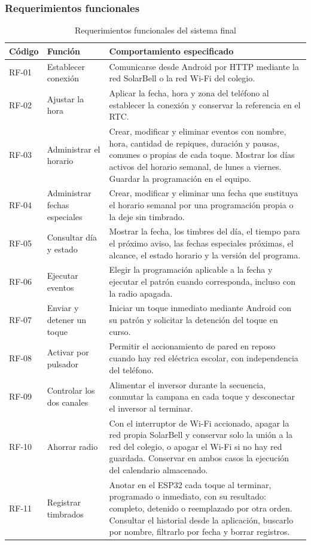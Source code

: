 \documentclass[a4paper,11pt]{article}
\begin{document}
\subsubsection{Requerimientos funcionales}
\begin{table}[H]
\centering\small
\caption{Requerimientos funcionales del sistema final}
\label{tab:rf}
\begin{tabularx}{\linewidth}{@{}P{1.33cm}P{3.02cm}Y@{}}
\toprule
\textbf{Código} & \textbf{Función} & \textbf{Comportamiento especificado} \\
\midrule
RF-01 & Establecer conexión & Comunicarse desde Android por HTTP mediante la red SolarBell o la red Wi-Fi del colegio. \\
RF-02 & Ajustar la hora & Aplicar la fecha, hora y zona del teléfono al establecer la conexión y conservar la referencia en el RTC. \\
RF-03 & Administrar el horario & Crear, modificar y eliminar eventos con nombre, hora, cantidad de repiques, duración y pausas, comunes o propias de cada toque. Mostrar los días activos del horario semanal, de lunes a viernes. Guardar la programación en el equipo. \\
RF-04 & Administrar fechas especiales & Crear, modificar y eliminar una fecha que sustituya el horario semanal por una programación propia o la deje sin timbrado. \\
RF-05 & Consultar día y estado & Mostrar la fecha, los timbres del día, el tiempo para el próximo aviso, las fechas especiales próximas, el alcance, el estado horario y la versión del programa. \\
RF-06 & Ejecutar eventos & Elegir la programación aplicable a la fecha y ejecutar el patrón cuando corresponda, incluso con la radio apagada. \\
RF-07 & Enviar y detener un toque & Iniciar un toque inmediato mediante Android con su patrón y solicitar la detención del toque en curso. \\
RF-08 & Activar por pulsador & Permitir el accionamiento de pared en reposo cuando hay red eléctrica escolar, con independencia del teléfono. \\
RF-09 & Controlar los dos canales & Alimentar el inversor durante la secuencia, conmutar la campana en cada toque y desconectar el inversor al terminar. \\
RF-10 & Ahorrar radio & Con el interruptor de Wi-Fi accionado, apagar la red propia SolarBell y conservar solo la unión a la red del colegio, o apagar el Wi-Fi si no hay red guardada. Conservar en ambos casos la ejecución del calendario almacenado. \\
RF-11 & Registrar timbrados & Anotar en el ESP32 cada toque al terminar, programado o inmediato, con su resultado: completo, detenido o reemplazado por otra orden. Consultar el historial desde la aplicación, buscarlo por nombre, filtrarlo por fecha y borrar registros. \\
\bottomrule
\end{tabularx}
\end{table}
\end{document}
